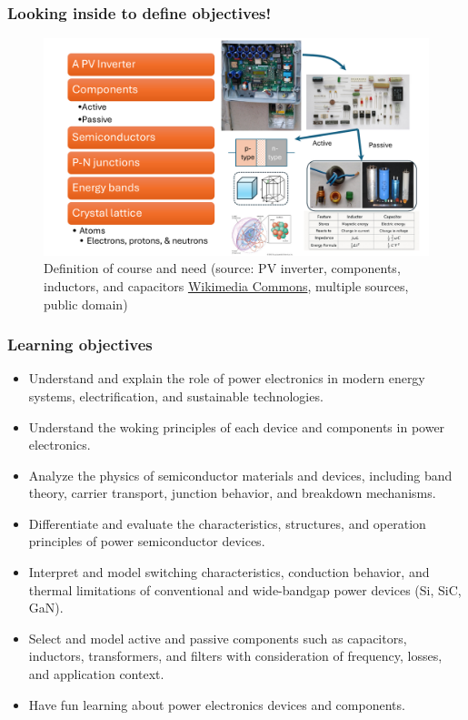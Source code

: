 \begin{frame}
	\frametitle{Looking inside to define objectives!}
	\begin{figure}
		\centering
		\includegraphics[scale=0.35]{fig/lec01/Flow_of_components.pdf}
		\caption{Definition of course and need (source: PV inverter, components, inductors, and capacitors \href{https://commons.wikimedia.org/wiki/Main_Page}{Wikimedia Commons}, multiple sources, public domain)}
	\end{figure}
\end{frame}

\begin{frame}
	\frametitle{Learning objectives}
	\begin{itemize}
		\item Understand and explain the role of power electronics in modern energy systems, electrification, and sustainable technologies. 
		\item Understand the woking principles of each device and components in power electronics.
		\item Analyze the physics of semiconductor materials and devices, including band theory, carrier transport, junction behavior, and breakdown mechanisms.
		\item Differentiate and evaluate the characteristics, structures, and operation principles of power semiconductor devices.
		\item Interpret and model switching characteristics, conduction behavior, and thermal limitations of conventional and wide-bandgap power devices (Si, SiC, GaN).
		\item Select and model active and passive components such as capacitors, inductors, transformers, and filters with consideration of frequency, losses, and application context.
		\item Have fun learning about power electronics devices and components.
	\end{itemize}
\end{frame}

